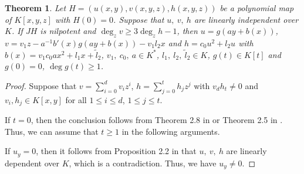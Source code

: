 \documentclass[12pt, twoside, leqno]{article}
\newtheorem{thm}{Theorem}[section]
\theoremstyle{definition}
\numberwithin{equation}{section}
\begin{document}
\begin{thm}\label{thm2.3}
Let $H=(u(x,y),v(x,y,z),h(x,y,z))$ be a polynomial map of $K[x,y,z]$ with $H(0)= 0$. Suppose that $u,~v,~h$ are linearly independent over $K$. If $JH$ is nilpotent and $\deg_zv\geq 3\deg_zh-1$, then $u=g(ay+b(x))$, $v=v_1z-a^{-1}b'(x)g(ay+b(x))-v_1l_2x$ and $h=c_0u^2+l_2u$ with $b(x)=v_1c_0ax^2+l_1x+\tilde{l}_2$, $v_1,~c_0,~a\in K^*$, $l_1,~l_2,~\tilde{l}_2\in K$, $g(t)\in K[t]$ and $g(0)=0$, $\deg g(t)\geq 1$.
\end{thm}
\begin{proof}
Suppose that $v=\sum_{i=0}^dv_iz^i$, $h=\sum_{j=0}^th_jz^j$ with $v_dh_t\neq 0$ and $v_i, h_j\in K[x,y]$ for all $1\leq i\leq d$, $1\leq j\leq t$.

If $t= 0$, then the conclusion follows from Theorem 2.8 in \cite{13} or Theorem 2.5 in \cite{14}. Thus, we can assume that $t\geq 1$ in the following arguments.

If $u_y=0$, then it follows from Proposition 2.2 in \cite{13} that $u,~v,~h$ are linearly dependent over $K$, which is a contradiction. Thus, we have $u_y\neq 0$.


\end{proof}
\end{document}
